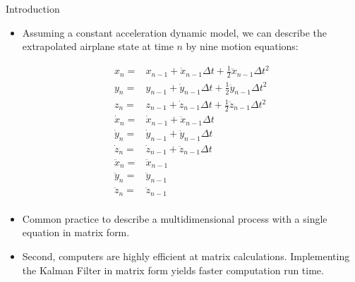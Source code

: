 \begin{frame}{Introduction}
    \begin{itemize}
        
    \item Assuming a constant acceleration dynamic model, we can describe the extrapolated airplane state at time $n$ by nine motion equations:
        
    \begin{align*}
     x_n = & x_{n-1} + \dot{x}_{n-1} \Delta t + \frac{1}{2}\ddot{x}_{n-1}\Delta t^2\\\nonumber
     y_n = & y_{n-1} + \dot{y}_{n-1} \Delta t + \frac{1}{2}\ddot{y}_{n-1}\Delta t^2\\\nonumber
     z_n = & z_{n-1} + \dot{z}_{n-1} \Delta t + \frac{1}{2}\ddot{z}_{n-1}\Delta t^2\\\nonumber
     \dot{x}_n = & \dot{x}_{n-1} + \ddot{x}_{n-1} \Delta t\\\nonumber
     \dot{y}_n = & \dot{y}_{n-1} + \ddot{y}_{n-1} \Delta t\\\nonumber
     \dot{z}_n = & \dot{z}_{n-1} + \ddot{z}_{n-1} \Delta t\\\nonumber
     \ddot{x}_{n} = & \ddot{x}_{n-1}\\\nonumber
     \ddot{y}_{n} = & \ddot{y}_{n-1}\\\nonumber
     \ddot{z}_{n} = & \ddot{z}_{n-1}\\\nonumber
    \end{align*}
    \item Common practice to describe a multidimensional process with a single equation in matrix form.
    
    \item Second, computers are highly efficient at matrix calculations. Implementing the Kalman Filter in matrix form yields faster computation run time.
    \end{itemize}
\end{frame}




